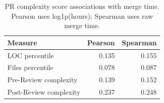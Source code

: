 \begin{table}[!h]
\caption{PR complexity score associations with merge time. Pearson uses log1p(hours); Spearman uses raw merge time.}\label{tab:corr}
\centering\small
\begin{tabular}{lrr}
\toprule
Measure & Pearson & Spearman \\
\midrule
LOC percentile & 0.135 & 0.155 \\
Files percentile & 0.078 & 0.087 \\
Pre-Review complexity & 0.139 & 0.152 \\
Post-Review complexity & 0.237 & 0.248 \\
\bottomrule
\end{tabular}
\end{table}
